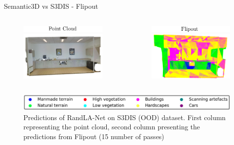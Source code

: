 \documentclass[aspectratio=169]{beamer}
\begin{document}
\begin{frame}{Semantic3D vs S3DIS - Flipout}
    \begin{columns}
        \begin{column}{0.5\textwidth}
            \begin{figure}
                \centering
                \includegraphics[scale=0.5]{images/s3dis/s3dis_fout_orig_head.png}
                \includegraphics[scale=0.5]{images/s3dis/s3dis_fout_orig.png}
            \end{figure}
        \end{column}
        \begin{column}{0.5\textwidth}
            \begin{figure}
                \centering
                \includegraphics[scale=0.5]{images/s3dis/s3dis_fout_semseg_head.png}
                \includegraphics[scale=0.5]{images/s3dis/s3dis_fout_semseg.png}
            \end{figure}
        \end{column}
    \end{columns}
    \begin{figure}
        \centering
        \includegraphics[scale=0.25]{images/legend.jpg}
        \caption{Predictions of RandLA-Net on S3DIS (OOD) dataset. First column representing the point
        cloud, second column presenting the predictions from Flipout (15 number of passes)}
    \end{figure}
\end{frame}
\end{document}
